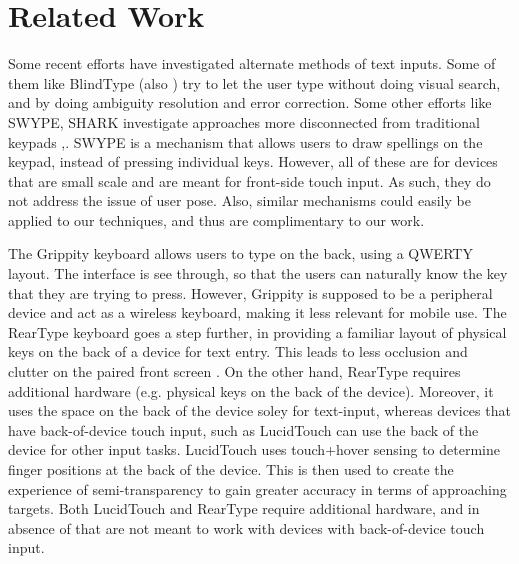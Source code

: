 \section{Related Work}

Some recent efforts have investigated alternate methods of text
inputs. Some of them like BlindType \cite{BlindType} (also
\cite{Brewster}) try to let the user type without doing visual search,
and by doing ambiguity resolution and error correction. Some other
efforts like SWYPE, SHARK investigate approaches more disconnected
from traditional keypads \cite{Zhai},\cite{Swype}. SWYPE is a
mechanism that allows users to draw spellings on the keypad, instead
of pressing individual keys. However, all of these are for devices
that are small scale and are meant for front-side touch input.  As
such, they do not address the issue of user pose.  Also, similar
mechanisms could easily be applied to our techniques, and thus are
complimentary to our work.

The Grippity keyboard \cite{Grippity} allows users to type on the
back, using a QWERTY layout. The interface is see through, so that the
users can naturally know the key that they are trying to
press. However, Grippity is supposed to be a peripheral device and act
as a wireless keyboard, making it less relevant for mobile use. The
RearType keyboard goes a step further, in providing a familiar layout
of physical keys on the back of a device for text entry. This leads to
less occlusion and clutter on the paired front screen
\cite{RearType}. On the other hand, RearType requires additional
hardware (e.g. physical keys on the back of the device). Moreover, it
uses the space on the back of the device soley for text-input, whereas
devices that have back-of-device touch input, such as LucidTouch
\cite{LucidTouch} can use the back of the device for other input
tasks. LucidTouch uses touch+hover sensing to determine finger
positions at the back of the device. This is then used to create the
experience of semi-transparency to gain greater accuracy in terms of
approaching targets. Both LucidTouch and RearType require additional hardware, and in absence of that are not meant to work with devices with back-of-device touch input. 

